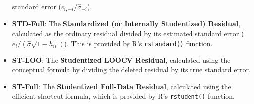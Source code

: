 \documentclass[
  letterpaper,
  DIV=11,
  numbers=noendperiod]{scrreprt}
\begin{document}
\begin{itemize}
  standard error (\(e_{i,-i} / \hat{\sigma}_{-i}\)).
\item
  \textbf{STD-Full}: The \textbf{Standardized (or Internally
  Studentized) Residual}, calculated as the ordinary residual divided by
  its estimated standard error
  (\(e_i / (\hat{\sigma}\sqrt{1-h_{ii}})\)). This is provided by R's
  \texttt{rstandard()} function.
\item
  \textbf{ST-LOO}: The \textbf{Studentized LOOCV Residual}, calculated
  using the conceptual formula by dividing the deleted residual by its
  true standard error.
\item
  \textbf{ST-Full}: The \textbf{Studentized Full-Data Residual},
  calculated using the efficient shortcut formula, which is provided by
  R's \texttt{rstudent()} function.
\end{itemize}
\end{document}
